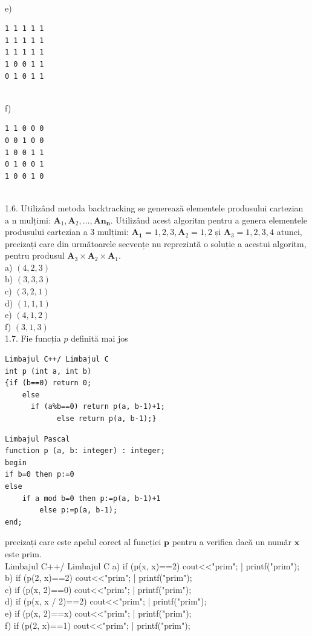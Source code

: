 \\
e) \begin{verbatim}
1 1 1 1 1
1 1 1 1 1
1 1 1 1 1
1 0 0 1 1
0 1 0 1 1
\end{verbatim}
\\
f) \begin{verbatim}
1 1 0 0 0
0 0 1 0 0
1 0 0 1 1
0 1 0 0 1
1 0 0 1 0
\end{verbatim}
\\
1.6. Utilizând metoda backtracking se generează elementele produsului cartezian a n mulțimi: $\mathbf{A}_{1}, \mathbf{A}_{2}, \ldots, \mathbf{A n}_{\mathbf{n}}$. Utilizând acest algoritm pentru a genera elementele produsului cartezian a 3 mulțimi: $\mathbf{A}_{\mathbf{1}}={1,2,3}, \mathbf{A}_{2}={1,2}$ și $\mathbf{A}_{3}={1,2,3,4}$ atunci, precizați care din următoarele secvențe nu reprezintă o soluție a acestui algoritm, pentru produsul $\mathbf{A}_{3} \times \mathbf{A}_{2} \times \mathbf{A}_{1}$.
\\
a) $(4,2,3)$
\\
b) $(3,3,3)$
\\
c) $(3,2,1)$
\\
d) $(1,1,1)$
\\
e) $(4,1,2)$
\\
f) $(3,1,3)$
\\
1.7. Fie funcția $p$ definită mai jos
\begin{verbatim}
Limbajul C++/ Limbajul C
int p (int a, int b)
{if (b==0) return 0;
    else
      if (a%b==0) return p(a, b-1)+1;
            else return p(a, b-1);}
\end{verbatim}
\begin{verbatim}
Limbajul Pascal
function p (a, b: integer) : integer;
begin
if b=0 then p:=0
else
    if a mod b=0 then p:=p(a, b-1)+1
        else p:=p(a, b-1);
end;
\end{verbatim}
precizați care este apelul corect al funcției $\mathbf{p}$ pentru a verifica dacă un număr $\mathbf{x}$ este prim.
\\
Limbajul C++/ Limbajul C
a) if (p(x, x)==2) cout<<"prim"; | printf("prim");
\\
b) if (p(2, x)==2) cout<<"prim"; | printf("prim");
\\
c) if (p(x, 2)==0) cout<<"prim"; | printf("prim");
\\
d) if (p(x, x / 2)==2) cout<<"prim"; | printf("prim");
\\
e) if (p(x, 2)==x) cout<<"prim"; | printf("prim");
\\
f) if (p(2, x)==1) cout<<"prim"; | printf("prim");
